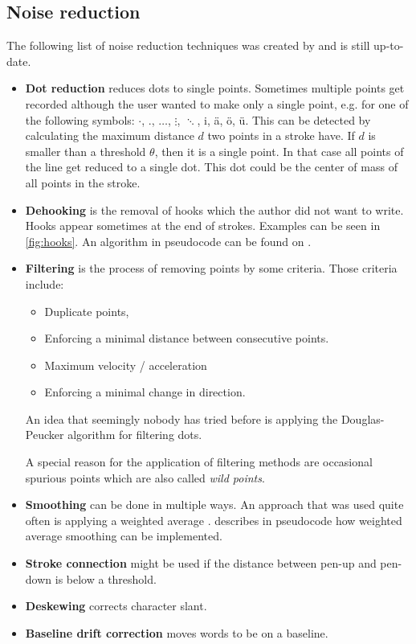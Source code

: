 \subsection{Noise reduction}
The following list of noise reduction techniques was created by \cite{Tappert90}
and is still up-to-date.
\begin{itemize}
    \item \textbf{Dot reduction} reduces dots to single points. Sometimes
          multiple points get recorded although the user wanted to make only
          a single point, e.g. for one of the following symbols:
          $\cdot$, ., $\dots$, $\vdots$, $\ddots$, i, ä, ö, ü.
          This can be detected by calculating
          the maximum distance $d$ two points in a stroke have. If $d$ is
          smaller than a threshold $\theta$, then it is a single point.
          In that case all points of the line get reduced to a single dot.
          This dot could be the center of mass of all points in the stroke.
    \item \textbf{Dehooking} is the removal of hooks which the author did not
          want to write. Hooks appear sometimes at the end of strokes.
          Examples can be seen in \cref{fig:hooks}. An algorithm in pseudocode
          can be found on .
    \item \textbf{Filtering} is the process of removing points by some criteria.
          Those criteria include:
          \begin{itemize}
              \item Duplicate points,
              \item Enforcing a minimal distance between consecutive 
                    points\cite{Tappert90}.
              \item Maximum velocity / acceleration\cite{Division87}
              \item Enforcing a minimal change in direction\cite{Tappert90}.
          \end{itemize}
          An idea that seemingly nobody has tried before is applying the
          Douglas-Peucker algorithm for filtering dots.

          A special reason for the application of filtering methods are occasional spurious points which are also called \textit{wild points}.
    \item \textbf{Smoothing} can be done in multiple ways. An approach that was
          used quite often is applying a weighted average
          \cite{Groner66,Division87,Arakaw83}. 
          describes in pseudocode how weighted average smoothing can be implemented.
    \item \textbf{Stroke connection} might be used if the distance between
          pen-up and pen-down is below a threshold.
    \item \textbf{Deskewing} corrects character slant.
    \item \textbf{Baseline drift correction} moves words to be on a baseline.
\end{itemize}

